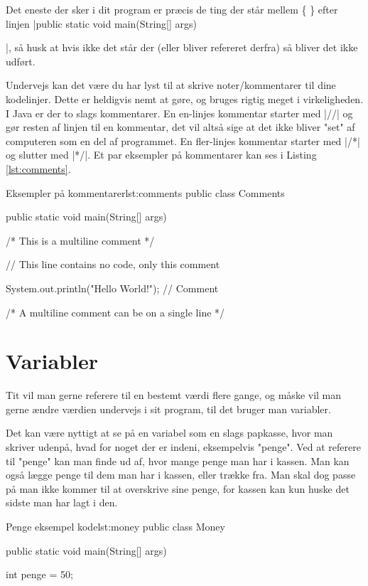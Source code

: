 Det eneste der sker i dit program er præcis de ting der står mellem \{ \} efter linjen \JavaInline|public static void main(String[] args) {|, så husk at hvis ikke det står der (eller bliver refereret derfra) så bliver det ikke udført.

\begin{remark}
	Undervejs kan det være du har lyst til at skrive noter/kommentarer til dine kodelinjer. Dette er heldigvis nemt at gøre, og bruges rigtig meget i virkeligheden. I Java er der to slags kommentarer. En en-linjes kommentar starter med \JavaInline|//| og gør resten af linjen til en kommentar, det vil altså sige at det ikke bliver "set" af computeren som en del af programmet. En fler-linjes kommentar starter med \JavaInline|/*| og slutter med \JavaInline|*/|. Et par eksempler på kommentarer kan ses i Listing \ref{lst:comments}.
\end{remark}

\begin{JavaCode}{Eksempler på kommentarer}{lst:comments}
	public class Comments {
		public static void main(String[] args) {
			/*
			This 
			is
			a 
			multiline 
			comment
			*/
			
			// This line contains no code, only this comment
			
			System.out.println("Hello World!");	// Comment
			
			/* A multiline comment can be on a single line */
		}
	}
\end{JavaCode}

\section{Variabler}
Tit vil man gerne referere til en bestemt værdi flere gange, og måske vil man gerne ændre værdien undervejs i sit program, til det bruger man variabler. 

Det kan være nyttigt at se på en variabel som en slags papkasse, hvor man skriver udenpå, hvad for noget der er indeni, eksempelvis "penge". Ved at referere til "penge" kan man finde ud af, hvor mange penge man har i kassen. Man kan også lægge penge til dem man har i kassen, eller trække fra. Man skal dog passe på man ikke kommer til at overskrive sine penge, for kassen kan kun huske det sidste man har lagt i den.

\begin{JavaCode}{Penge eksempel kode}{lst:money}
public class Money {
	public static void main(String[] args) {
		int penge = 50;
		
}}
\end{JavaCode}}
